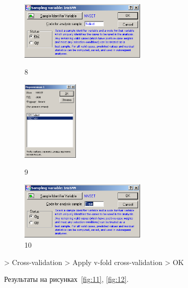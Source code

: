 \begin{figure}[!h]
  \centering

  \begin{minipage}{0.32\textwidth}
    \centering

    \includegraphics[width=6cm]
    {inc/ex_8.PNG}

    \caption{8}

    \label{fig:8}
  \end{minipage}
  \begin{minipage}{0.32\textwidth}
    \centering

    \includegraphics[height=3.8cm]
    {inc/ex_9.PNG}

    \caption{9}

    \label{fig:9}
  \end{minipage}
  \begin{minipage}{0.32\textwidth}
    \centering

    \includegraphics[width=6cm]
    {inc/ex_10.PNG}

    \caption{10}

    \label{fig:10}
  \end{minipage}
\end{figure}

\newpage

> Cross-validation > Apply v-fold cross-validation > OK

Результаты на рисунках~\ref{fig:11}, \ref{fig:12}.


